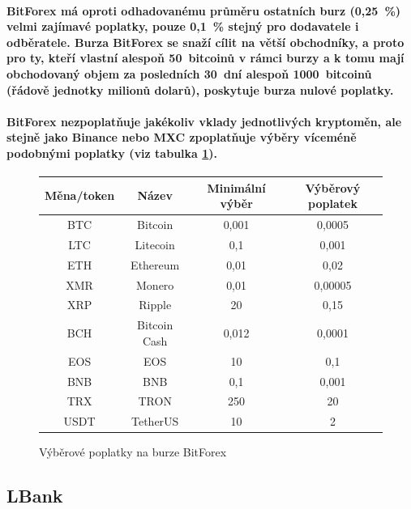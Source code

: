 \documentclass[thesis=B,czech]{FITthesis}[2019/03/21]
\begin{document}
\paragraph{
BitForex má oproti odhadovanému průměru ostatních burz (0,25~\%) velmi zajímavé poplatky, pouze 0,1~\% stejný pro dodavatele i odběratele. Burza BitForex se snaží cílit na větší obchodníky, a proto pro ty, kteří vlastní alespoň 50~bitcoinů v rámci burzy a k tomu mají obchodovaný objem za posledních 30~dní alespoň 1000~bitcoinů (řádově jednotky milionů dolarů), poskytuje burza nulové poplatky. 
}
\paragraph{
BitForex nezpoplatňuje jakékoliv vklady jednotlivých kryptoměn, ale stejně jako Binance nebo MXC zpoplatňuje výběry víceméně podobnými poplatky (viz tabulka \ref{bitforex_fees}). \cite{cryptowisser_bitforex}
}

\begin{figure}\centering
    \begin{center}
     \begin{tabular}{||c | c | c | c||} 
     \hline
     Měna/token & Název & Minimální výběr & Výběrový poplatek \\ [0.5ex] 
     \hline\hline
     BTC & Bitcoin & 0,001 & 0,0005 \\ 
     \hline
     LTC & Litecoin & 0,1 & 0,001 \\
     \hline
     ETH & Ethereum & 0,01 & 0,02 \\
     \hline
     XMR & Monero & 0,01 & 0,00005 \\
     \hline
     XRP & Ripple & 20 & 0,15 \\
     \hline
     BCH & Bitcoin Cash & 0,012 & 0,0001 \\
     \hline
     EOS & EOS & 10 & 0,1 \\
     \hline
     BNB & BNB & 0,1 & 0,001 \\
     \hline
     TRX & TRON & 250 & 20 \\
     \hline
     USDT & TetherUS & 10 & 2 \\ [1ex] 
     \hline
    \end{tabular}
    \end{center}
    \caption{Výběrové poplatky na burze BitForex \cite{bitforex_fees}}
    \label{bitforex_fees}
\end{figure}

\subsection{LBank}
\end{document}
